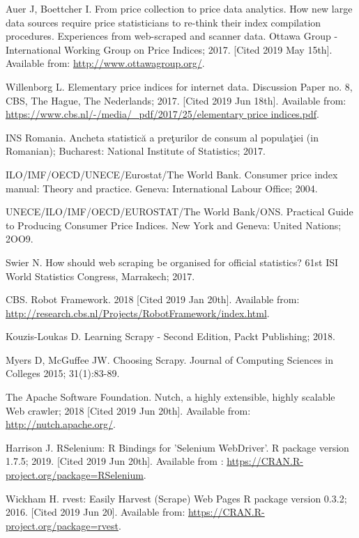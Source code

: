 \documentclass[]{article}
\begin{document}
\begin{thebibliography}{99}
Auer J, Boettcher I. From price collection to price data analytics. How new large data sources require price statisticians to re-think their index compilation procedures. Experiences from web-scraped and scanner data.
Ottawa Group - International Working Group on Price Indices; 2017. [Cited 2019 May 15th]. Available from: \url{http://www.ottawagroup.org/}.

Willenborg L. Elementary price indices for internet data. Discussion Paper no. 8, CBS, The Hague, The Nederlands; 2017. [Cited 2019 Jun 18th]. Available from:
\url{https://www.cbs.nl/-/media/_pdf/2017/25/elementary price indices.pdf}.

INS Romania. Ancheta statistică a preţurilor de consum al populaţiei (in Romanian); Bucharest: National Institute of Statistics; 2017.

ILO/IMF/OECD/UNECE/Eurostat/The World Bank. Consumer price index manual: Theory and practice. Geneva: International Labour Office; 2004.

UNECE/ILO/IMF/OECD/EUROSTAT/The World Bank/ONS. Practical Guide to Producing Consumer Price Indices. New York and Geneva: United Nations; 2OO9.

Swier N. How should web scraping be organised for official statistics? 61st ISI World Statistics Congress, Marrakech; 2017.

CBS. Robot Framework. 2018 [Cited 2019 Jan 20th]. Available from: \url{http://research.cbs.nl/Projects/RobotFramework/index.html}.

Kouzis-Loukas D. Learning Scrapy - Second Edition, Packt Publishing; 2018.

Myers D, McGuffee JW. Choosing Scrapy. Journal of Computing Sciences in Colleges 2015; 31(1):83-89.

The Apache Software Foundation. Nutch, a highly extensible, highly scalable Web crawler; 2018 [Cited 2019 Jun 20th]. Available from:
\url{http://nutch.apache.org/}.

Harrison J. RSelenium: R Bindings for 'Selenium WebDriver'. R package version 1.7.5; 2019. [Cited 2019 Jun 20th]. Available from :
\url{https://CRAN.R-project.org/package=RSelenium}.

Wickham H. rvest: Easily Harvest (Scrape) Web Pages {R package version 0.3.2}; 2016. [Cited 2019 Jun 20]. Available from:
\url{https://CRAN.R-project.org/package=rvest}.


\end{thebibliography}
\end{document}
